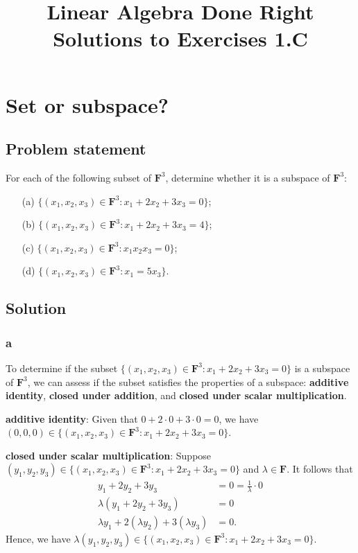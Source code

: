\documentclass{article}
\title{Linear Algebra Done Right\\Solutions to Exercises 1.C}
\author{}
\date{}
\begin{document}
\maketitle

\section{Set or subspace?}
\subsection*{Problem statement}
For each of the following subset of $\mathbf{F}^3$, determine whether it is a subspace of $\mathbf{F}^3$:
\begin{itemize}
  \item[(a)] $\{(x_1,x_2,x_3)\in\mathbf{F}^3:x_1+2x_2+3x_3=0\}$;
  \item[(b)] $\{(x_1,x_2,x_3)\in\mathbf{F}^3:x_1+2x_2+3x_3=4\}$;
  \item[(c)] $\{(x_1,x_2,x_3)\in\mathbf{F}^3:x_1x_2x_3=0\}$;
  \item[(d)] $\{(x_1,x_2,x_3)\in\mathbf{F}^3:x_1=5x_3\}$.
\end{itemize}

\subsection*{Solution}
\subsubsection*{a}
To determine if the subset $\{(x_1,x_2,x_3)\in\mathbf{F}^3:x_1+2x_2+3x_3=0\}$ is a subspace of $\mathbf{F}^3$, we can assess if the subset satisfies the properties of a subspace: \textbf{additive identity}, \textbf{closed under addition}, and \textbf{closed under scalar multiplication}.

\textbf{additive identity}: Given that $0+2\cdot0+3\cdot0=0$, we have \newline $(0,0,0)\in\{(x_1,x_2,x_3)\in\mathbf{F}^3:x_1+2x_2+3x_3=0\}$.

\textbf{closed under scalar multiplication}: Suppose\newline $(y_1,y_2,y_3)\in\{(x_1,x_2,x_3)\in\mathbf{F}^3:x_1+2x_2+3x_3=0\}$ and $\lambda\in\mathbf{F}$. 
It follows that 
\begin{align*}
    y_1+2y_2+3y_3&=0=\frac{1}{\lambda}\cdot0\\
    \lambda(y_1+2y_2+3y_3)&=0\\
    \lambda y_1+2(\lambda y_2)+3(\lambda y_3)&=0.
\end{align*}
Hence, we have $\lambda(y_1,y_2,y_3)\in\{(x_1,x_2,x_3)\in\mathbf{F}^3:x_1+2x_2+3x_3=0\}$.
\end{document}
